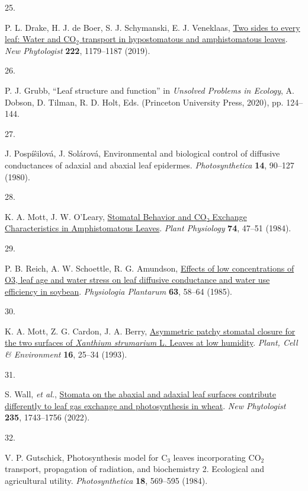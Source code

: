 \documentclass[
  letterpaper,
  DIV=11,
  numbers=noendperiod]{scrartcl}
\newlength{\cslhangindent}
\newlength{\csllabelwidth}
\newenvironment{CSLReferences}[2] %
 {\begin{list}{}{%
  \setlength{\itemindent}{0pt}
  \setlength{\leftmargin}{0pt}
  \setlength{\parsep}{0pt}
  \ifodd #1
   \setlength{\leftmargin}{\cslhangindent}
   \setlength{\itemindent}{-1\cslhangindent}
  \fi
  \setlength{\itemsep}{#2\baselineskip}}}
 {\end{list}}
\newcommand{\CSLLeftMargin}[1]{\parbox[t]{\csllabelwidth}{\strut#1\strut}}
\newcommand{\CSLRightInline}[1]{\parbox[t]{\linewidth - \csllabelwidth}{\strut#1\strut}}
\begin{document}
\begin{CSLReferences}{0}{1}
\CSLLeftMargin{25. }%
\CSLRightInline{P. L. Drake, H. J. de Boer, S. J. Schymanski, E. J.
Veneklaas, \href{https://doi.org/10.1111/nph.15652}{Two sides to every
leaf: Water and {CO}\(_{\textrm{2}}\) transport in hypostomatous and
amphistomatous leaves}. \emph{New Phytologist} \textbf{222}, 1179--1187
(2019).}

\CSLLeftMargin{26. }%
\CSLRightInline{P. J. Grubb, {``Leaf structure and function''} in
\emph{Unsolved {Problems} in {Ecology}}, A. Dobson, D. Tilman, R. D.
Holt, Eds. (Princeton University Press, 2020), pp. 124--144.}

\CSLLeftMargin{27. }%
\CSLRightInline{J. Pospíŝilová, J. Solárová, Environmental and
biological control of diffusive conductances of adaxial and abaxial leaf
epidermes. \emph{Photosynthetica} \textbf{14}, 90--127 (1980).}

\CSLLeftMargin{28. }%
\CSLRightInline{K. A. Mott, J. W. O'Leary,
\href{http://www.jstor.org/stable/4268406}{Stomatal {Behavior} and {CO}₂
{Exchange} {Characteristics} in {Amphistomatous} {Leaves}}. \emph{Plant
Physiology} \textbf{74}, 47--51 (1984).}

\CSLLeftMargin{29. }%
\CSLRightInline{P. B. Reich, A. W. Schoettle, R. G. Amundson,
\href{https://doi.org/10.1111/j.1399-3054.1985.tb02818.x}{Effects of low
concentrations of {O3}, leaf age and water stress on leaf diffusive
conductance and water use efficiency in soybean}. \emph{Physiologia
Plantarum} \textbf{63}, 58--64 (1985).}

\CSLLeftMargin{30. }%
\CSLRightInline{K. A. Mott, Z. G. Cardon, J. A. Berry,
\href{https://doi.org/10.1111/j.1365-3040.1993.tb00841.x}{Asymmetric
patchy stomatal closure for the two surfaces of \emph{{Xanthium}
strumarium} {L}. Leaves at low humidity}. \emph{Plant, Cell \&
Environment} \textbf{16}, 25--34 (1993).}

\CSLLeftMargin{31. }%
\CSLRightInline{S. Wall, \emph{et al.},
\href{https://doi.org/10.1111/nph.18257}{Stomata on the abaxial and
adaxial leaf surfaces contribute differently to leaf gas exchange and
photosynthesis in wheat}. \emph{New Phytologist} \textbf{235},
1743--1756 (2022).}

\CSLLeftMargin{32. }%
\CSLRightInline{V. P. Gutschick, Photosynthesis model for
{C}\(_{\textrm{3}}\) leaves incorporating {CO}\(_{\textrm{2}}\)
transport, propagation of radiation, and biochemistry 2. Ecological and
agricultural utility. \emph{Photosynthetica} \textbf{18}, 569--595
(1984).}


\end{CSLReferences}
\end{document}
